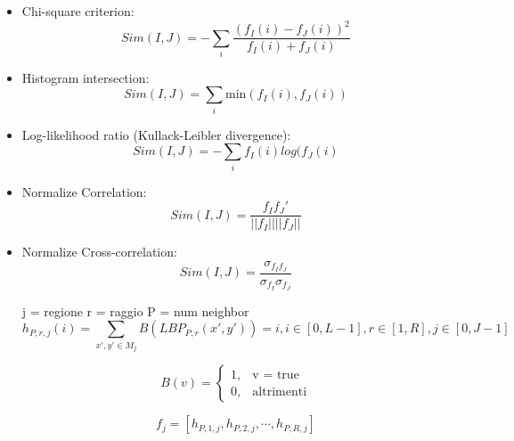 \begin{itemize}

\item Chi-square criterion:
\begin{equation}
Sim(I, J) = -  \sum_{i} \frac{ (f_{I}(i) - f_{J}(i) )^2}{f_{I}(i) + f_{J}(i)}
\end{equation}

\item Histogram intersection:
\begin{equation}
Sim(I, J) = \sum_{i} \mbox{min}(f_{I}(i),f_{J}(i))
\end{equation}

\item Log-likelihood ratio (Kullack-Leibler 
divergence):
\begin{equation}
Sim(I, J) = - \sum_{i} f_{I}(i)log(f_{J}(i)
\end{equation}

\item Normalize Correlation:
\begin{equation}
Sim(I, J) = \frac{f_{I}f_{J}'}{||f_{I}|| ||f_{J}||}
\end{equation}

\item Normalize Cross-correlation:
\begin{equation}
Sim(I, J) = \frac{\sigma_{f_{I}f_{J}}}{\sigma_{f_{I}}\sigma_{f_{J}}}
\end{equation}





j = regione
r = raggio
P = num neighbor
\begin{equation}
h_{P,r,j}(i) = \sum_{x',y' \in M_j} B(LBP_{P,r}(x', y')) = i, i \in  [0, L-1 ], r \in [1, R], j \in [0, J-1]
\end{equation}

\begin{equation}
B(v) = 	\begin{cases} 1, & \mbox{v = true} \\ 0, & \mbox{altrimenti} \end{cases}
\end{equation}

\begin{equation}
f_{j} = [h_{P, 1, j}, h_{P, 2, j}, \cdots, h_{P, R, j}]
\end{equation}

\end{itemize}